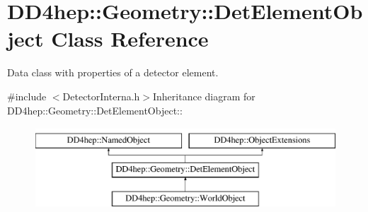 \hypertarget{class_d_d4hep_1_1_geometry_1_1_det_element_object}{
\section{DD4hep::Geometry::DetElementObject Class Reference}
\label{class_d_d4hep_1_1_geometry_1_1_det_element_object}
}


Data class with properties of a detector element.  


{\ttfamily \#include $<$DetectorInterna.h$>$}Inheritance diagram for DD4hep::Geometry::DetElementObject::\begin{figure}[H]
\begin{center}
\leavevmode
\includegraphics[height=3cm]{class_d_d4hep_1_1_geometry_1_1_det_element_object}
\end{center}
\end{figure}
